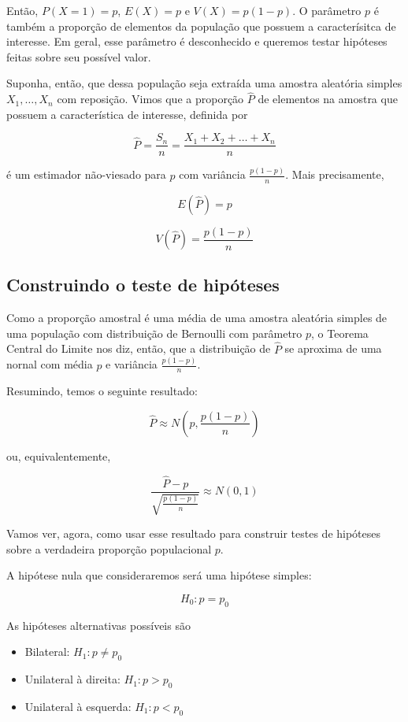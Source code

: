 \documentclass[
]{book}
\providecommand{\tightlist}{%
  \setlength{\itemsep}{0pt}\setlength{\parskip}{0pt}}
\begin{document}
Então, \(P(X = 1) = p\), \(E(X) = p\) e \(V(X) = p(1-p)\). O parâmetro \(p\) é também a proporção de elementos da população que possuem a caracterísitca de interesse. Em geral, esse parâmetro é desconhecido e queremos testar hipóteses feitas sobre seu possível valor.

Suponha, então, que dessa população seja extraída uma amostra aleatória simples \(X_1,\ldots,X_n\) com reposição. Vimos que a proporção \(\hat P\) de elementos na amostra que possuem a característica de interesse, definida por

\[\hat P = \frac{S_n}{n} = \frac{X_1+X_2+\ldots+X_n}{n}\]

é um estimador não-viesado para \(p\) com variância \(\frac{p(1-p)}{n}\). Mais precisamente,

\[E(\hat P)=p\]

\[V(\hat P)=\frac{p(1-p)}{n}\]

\hypertarget{construindo-o-teste-de-hipuxf3teses-2}{%
\subsection{Construindo o teste de hipóteses}\label{construindo-o-teste-de-hipuxf3teses-2}}

Como a proporção amostral é uma média de uma amostra aleatória simples de uma população com distribuição de Bernoulli com parâmetro \(p\), o Teorema Central do Limite nos diz, então, que a distribuição de \(\hat P\) se aproxima de uma nornal com média \(p\) e variância \(\frac{p(1-p)}{n}\).

Resumindo, temos o seguinte resultado:

\[\hat P \approx N\left(p,\frac{p(1-p)}{n}\right)\]

ou, equivalentemente,

\[\frac{\hat P-p}{\sqrt{\frac{p(1-p)}{n}}}\approx N(0,1)\]

Vamos ver, agora, como usar esse resultado para construir testes de hipóteses sobre a verdadeira proporção populacional \(p\).

A hipótese nula que consideraremos será uma hipótese simples:

\[H_0:p=p_0\]

As hipóteses alternativas possíveis são

\begin{itemize}
\tightlist
\item
  Bilateral: \(H_1:p\neq p_0\)
\item
  Unilateral à direita: \(H_1:p > p_0\)
\item
  Unilateral à esquerda: \(H_1:p < p_0\)
\end{itemize}
\end{document}
